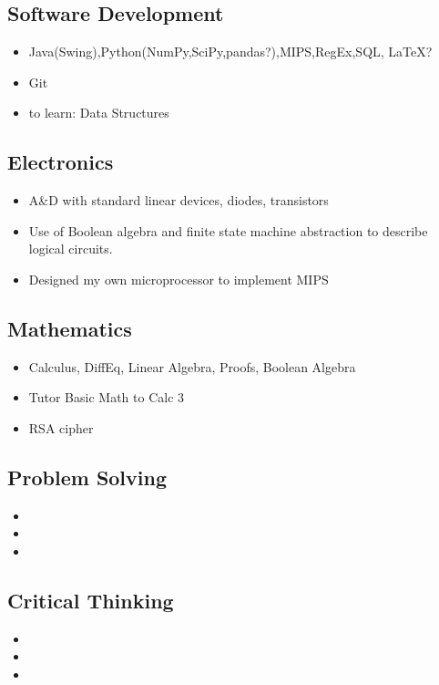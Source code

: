 \documentclass{article}
\begin{document}
    \subsection{Software Development}
      \begin{itemize}
        \item Java(Swing),Python(NumPy,SciPy,pandas?),MIPS,RegEx,SQL, LaTeX?
        \item Git
        \item to learn: Data Structures
      \end{itemize}
    \subsection{Electronics}
      \begin{itemize}
        \item A&D with standard linear devices, diodes, transistors
        \item Use of Boolean algebra and finite state machine abstraction to describe logical circuits.
        \item Designed my own microprocessor to implement MIPS
      \end{itemize}
    \subsection{Mathematics}
      \begin{itemize}
        \item Calculus, DiffEq, Linear Algebra, Proofs, Boolean Algebra
        \item Tutor Basic Math to Calc 3
        \item RSA cipher
      \end{itemize}
    \subsection{Problem Solving}
      \begin{itemize}
        \item 
        \item 
        \item 
      \end{itemize}
    \subsection{Critical Thinking}
      \begin{itemize}
        \item 
        \item 
        \item 
      \end{itemize}
\end{document}

